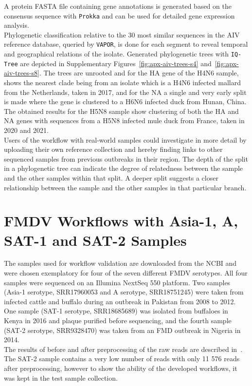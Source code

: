 A protein FASTA file containing gene annotations is generated based on the consensus sequence with \texttt{Prokka} and can be used for detailed gene expression analysis.  \\
Phylogenetic classification relative to the 30 most similar sequences in the \ac{AIV} reference database, queried by \texttt{VAPOR}, is done for each segment to reveal temporal and geographical relations of the isolate. Generated phylogenetic trees with \texttt{IQ-Tree} are depicted in Supplementary Figures~\ref{fig:apx-aiv-trees-s4} and~\ref{fig:apx-aiv-trees-s8}. The trees are unrooted and for the \ac{HA} gene of the H4N6 sample, shows the nearest clade being from an isolate which is a H4N6 infected mallard from the Netherlands, taken in 2017, and for the \ac{NA} a single and very early split is made where the gene is clustered to a H6N6 infected duck from Hunan, China. The obtained results for the H5N8 sample show clustering of both the \ac{HA} and \ac{NA} genes with sequences from a H5N8 infected mule duck from France, taken in 2020 and 2021.\\
Users of the workflow with real-world samples could investigate in more detail by uploading their own reference collection and hereby finding links to other sequenced samples from previous outbreaks in their region. The depth of the split in a phylogenetic tree can indicate the degree of relatedness between the sample and the other samples within that split. A deeper split suggests a closer relationship between the sample and the other samples in that particular branch.

\section{FMDV Workflows with Asia-1, A, SAT-1 and SAT-2 Samples}
The samples used for workflow validation are downloaded from the \ac{NCBI} and were chosen exemplatory for four of the seven different \ac{FMDV} serotypes. All four samples were sequenced on an Illumina NextSeq 550 platform. Two samples (Asia-1 serotype, SRR17960053 and A serotype, SRR18751245) were taken from infected cattle and buffalo during an outbreak in Pakistan from 2008 to 2012. One sample (SAT-1 serotype, SRR18685689) was isolated from buffaloes in Kenya in 2016 and plaque purified before sequencing, and the fourth sample (SAT-2 serotype, SRR9328470) was taken from an \ac{FMD} outbreak in Nigeria in 2014. \\
The results of before and after preprocessing of the raw reads are described in~. The SAT-2 sample contains a very low number of reads with only 11 576 reads after preprocessing, however to show the ability of the developed workflows, it was kept in the test sample collection. 
\\

